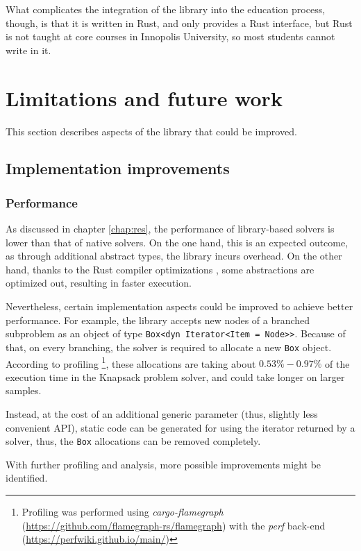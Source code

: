 What complicates the integration of the library into the education process, though, is that
it is written in Rust, and only provides a Rust interface, but Rust is not taught at
core courses in Innopolis University, so most students cannot write in it.

\section{Limitations and future work}

This section describes aspects of the library that could be improved.

\subsection{Implementation improvements}

\subsubsection{Performance}

As discussed in chapter \ref{chap:res}, the performance of library-based solvers is lower
than that of native solvers. On the one hand, this is an expected outcome, as through
additional abstract types, the library incurs overhead. On the other hand, thanks to the
Rust compiler optimizations \cite{klabnik2023rust},
some abstractions are optimized out, resulting in faster execution.

Nevertheless, certain implementation aspects could be improved to achieve better performance.
For example, the library accepts new nodes of a branched subproblem as an object of type
\texttt{Box<dyn Iterator<Item = Node>>}. Because of that, on every branching, the solver
is required to allocate a new \texttt{Box} object.
According to profiling
\footnote{Profiling was performed using \emph{cargo-flamegraph}
(\url{https://github.com/flamegraph-rs/flamegraph})
with the \emph{perf} back-end (\url{https://perfwiki.github.io/main/})},
these allocations are taking about
$0.53\% - 0.97\%$ of the execution time in the Knapsack problem solver,
and could take longer on larger samples.

Instead, at the cost of an additional generic parameter (thus, slightly less convenient
API), static code can be generated for using the iterator returned by a solver, thus,
the \texttt{Box} allocations can be removed completely.

With further profiling and analysis, more possible improvements might be identified.

